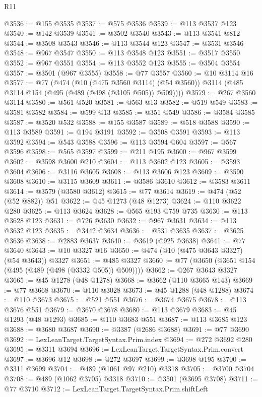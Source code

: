 \begin{lexlean}{R11}
\begin{coremodule}
{{{{{{{{{{{{{{{{{{{{{{{{{{{{{{{{{{{{{{{{{{{{{{{{{{{{{{{{{{{{{{{{{{{{{{{{{{{{{{{{{{{{{{{{{{{{{{{{{{{{{{{{{{@3536 := @155 @3535
@3537 := @575 @3536
@3539 := @113 @3537 @123
@3540 := @142 @3539
@3541 := @3502 @3540
@3543 := @113 @3541 @812
@3544 := @3508 @3543
@3546 := @113 @3544 @123
@3547 := @3531 @3546
@3548 := @967 @3547
@3550 := @113 @3548 @123
@3551 := @3517 @3550
@3552 := @967 @3551
@3554 := @113 @3552 @123
@3555 := @3504 @3554
@3557 := @3501 (@967 @3555)
@3558 := @77 @3557
@3560 := @10 @3114 @16
@3577 := @77
    (@474
      (@10 (@475 @3560 @3114) (@54 @3560))
      @3114
      (@485 @3114 @154 (@495 (@489 (@498 (@3105 @505)) @509))))
@3579 := @267 @3560 @3114
@3580 := @561 @520
@3581 := @563 @13
@3582 := @519 @549
@3583 := @3581 @3582
@3584 := @599 @13
@3585 := @351 @549
@3586 := @3584 @3585
@3587 := @3520 @532
@3588 := @155 @3587
@3589 := @518 @3588
@3590 := @113 @3589
@3591 := @194 @3191
@3592 := @3508 @3591
@3593 := @113 @3592
@3594 := @543 @3588
@3596 := @113 @3594 @604
@3597 := @567 @3596
@3598 := @565 @3597
@3599 := @211 @195
@3600 := @967 @3599
@3602 := @3598 @3600 @210
@3604 := @113 @3602 @123
@3605 := @3593 @3604
@3606 := @3116 @3605
@3608 := @113 @3606 @123
@3609 := @3590 @3608
@3610 := @3115 @3609
@3611 := @3586 @3610
@3612 := @3583 @3611
@3614 := @3579 (@3580 @3612)
@3615 := @77 @3614
@3619 := @474 (@52 (@52 @882)) @51
@3622 := @45 @1273 (@48 @1273)
@3624 := @110 @3622 @280
@3625 := @113 @3624
@3628 := @565 @193 @759 @735
@3630 := @113 @3628 @123
@3631 := @726 @3630
@3632 := @967 @3631
@3634 := @113 @3632 @123
@3635 := @3442 @3634
@3636 := @531 @3635
@3637 := @3625 @3636
@3638 := @2883 @3637
@3640 := @3619 (@925 @3638)
@3641 := @77 @3640
@3643 := @10 @3327 @16
@3650 := @474 (@10 (@475 @3643 @3327) (@54 @3643)) @3327
@3651 := @485 @3327
@3660 := @77 (@3650 (@3651 @154 (@495 (@489 (@498 (@3332 @505)) @509))))
@3662 := @267 @3643 @3327
@3665 := @45 @1278 (@48 @1278)
@3668 := @3662 (@110 @3665 @143)
@3669 := @77 @3668
@3670 := @110 @3028
@3673 := @45 @1288 (@48 @1288)
@3674 := @110 @3673
@3675 := @521 @551
@3676 := @3674 @3675
@3678 := @113 @3676 @551
@3679 := @3670 @3678
@3680 := @113 @3679
@3683 := @45 @1293 (@48 @1293)
@3685 := @110 @3683 @551
@3687 := @113 @3685 @123
@3688 := @3680 @3687
@3690 := @3387 (@2686 @3688)
@3691 := @77 @3690
@3692 := LexLeanTarget.TargetSyntax.Prim.index
@3694 := @272 @3692 @280
@3695 := @3311 @3694
@3696 := LexLeanTarget.TargetSyntax.Prim.convert
@3697 := @3696 @12
@3698 := @272 @3697
@3699 := @3698 @195
@3700 := @3311 @3699
@3704 := @489 (@1061 @97 @210) @3318
@3705 := @3700 @3704
@3708 := @489 (@1062 @3705) @3318
@3710 := @3501 (@3695 @3708)
@3711 := @77 @3710
@3712 := LexLeanTarget.TargetSyntax.Prim.shiftLeft
}}}}}}}}}}}}}}}}}}}}}}}}}}}}}}}}}}}}}}}}}}}}}}}}}}}}}}}}}}}}}}}}}}}}}}}}}}}}}}}}}}}}}}}}}}}}}}}}}}}}}}}}}}
\end{coremodule}
\end{lexlean}
